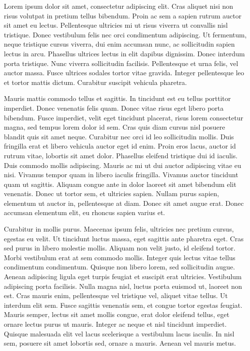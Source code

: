 Lorem ipsum dolor sit amet, consectetur adipiscing elit.
Cras aliquet nisi non risus volutpat in pretium tellus bibendum.
Proin ac sem a sapien rutrum auctor sit amet eu lectus.
Pellentesque ultricies mi ut risus viverra ut convallis nisl tristique.
Donec vestibulum felis nec orci condimentum adipiscing.
Ut fermentum, neque tristique cursus viverra, dui enim accumsan nunc, ac sollicitudin sapien lectus in arcu.
Phasellus ultrices lectus in elit dapibus dignissim.
Donec interdum porta tristique.
Nunc viverra sollicitudin facilisis.
Pellentesque et urna felis, vel auctor massa.
Fusce ultrices sodales tortor vitae gravida.
Integer pellentesque leo et tortor mattis dictum.
Curabitur suscipit vehicula pharetra.

Mauris mattis commodo tellus et sagittis.
In tincidunt est eu tellus porttitor imperdiet.
Donec venenatis felis quam.
Donec vitae risus eget libero porta bibendum.
Fusce imperdiet, velit eget tincidunt placerat, risus lorem consectetur magna, sed tempus lorem dolor id sem.
Cras quis diam cursus nisl posuere blandit quis sit amet neque.
Curabitur nec orci id leo sollicitudin mollis.
Duis fringilla erat et libero vehicula auctor eget id enim.
Proin eros lacus, auctor id rutrum vitae, lobortis sit amet dolor.
Phasellus eleifend tristique dui id iaculis.
Duis commodo mollis adipiscing.
Mauris ac mi ut dui auctor adipiscing vitae eu nisi.
Vivamus tempor quam in libero iaculis fringilla.
Vivamus auctor tincidunt quam ut sagittis.
Aliquam congue ante in dolor laoreet sit amet bibendum elit venenatis.
Donec ut tortor sem, et ultricies sapien.
Nullam purus sapien, elementum ut auctor in, pellentesque at diam.
Donec sit amet augue erat.
Donec accumsan elementum elit, eu rhoncus sapien varius et.

Curabitur in mollis purus.
Maecenas ipsum felis, ultricies nec pretium cursus, egestas eu velit.
Ut tincidunt luctus massa, eget sagittis ante pharetra eget.
Cras sed purus in libero molestie mollis.
Aliquam non velit justo, id eleifend tortor.
Morbi vestibulum erat at sem commodo mollis.
Integer quis lectus vitae tellus condimentum condimentum.
Quisque non libero lorem, sed sollicitudin augue.
Aenean adipiscing ligula eget turpis feugiat et suscipit erat ultricies.
Vestibulum adipiscing porta facilisis.
Nulla magna nisl, luctus porta euismod ut, laoreet non est.
Cras mauris enim, pellentesque vel tristique vel, aliquet vitae tellus.
Ut interdum elit sem.
Fusce sagittis venenatis sem, et congue tortor egestas feugiat.
Mauris semper, lectus sit amet mollis congue, erat dolor eleifend tellus, eget ornare lectus purus ut mauris.
Integer ac neque et nisl tincidunt imperdiet.
Quisque malesuada elit vel lacus scelerisque a vestibulum lacus iaculis.
In nisl sem, posuere sit amet lobortis sed, ornare a mauris.
Aenean vel mauris metus.

